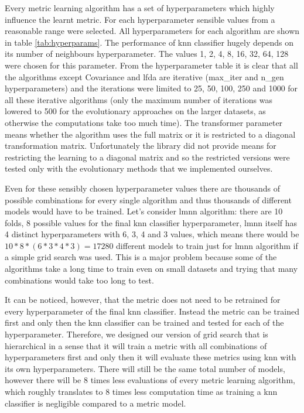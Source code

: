 \documentclass[12pt,a4paper]{report}
\begin{document}
Every metric learning algorithm has a set of hyperparameters which highly influence the learnt metric. For each hyperparameter sensible values from a reasonable range were selected. All hyperparameters for each algorithm are shown in table \ref{tab:hyperparams}. The performance of \ac{knn} classifier hugely depends on its number of neighbours hyperparameter. The values 1, 2, 4, 8, 16, 32, 64, 128 were chosen for this parameter. From the hyperparameter table it is clear that all the algorithms except Covariance and \ac{lfda} are iterative (max\_iter and n\_gen hyperparameters) and the iterations were limited to 25, 50, 100, 250 and 1000 for all these iterative algorithms (only the maximum number of iterations was lowered to 500 for the evolutionary approaches on the larger datasets, as otherwise the computations take too much time). The transformer parameter means whether the algorithm uses the full matrix or it is restricted to a diagonal transformation matrix. Unfortunately the library did not provide means for restricting the learning to a diagonal matrix and so the restricted versions were tested only with the evolutionary methods that we implemented ourselves. %



Even for these sensibly chosen hyperparameter values there are thousands of possible combinations for every single algorithm and thus thousands of different models would have to be trained. Let's consider \ac{lmnn} algorithm: there are 10 folds, 8 possible values for the final \ac{knn} classifier hyperparameter, \ac{lmnn} itself has 4 distinct hyperparameters with 6, 3, 4 and 3 values, which means there would be $10*8*(6*3*4*3)=17280$ different models to train just for \ac{lmnn} algorithm if a simple grid search was used. This is a major problem because some of the algorithms take a long time to train even on small datasets and trying that many combinations would take too long to test.

It can be noticed, however, that the metric does not need to be retrained for every hyperparameter of the final \ac{knn} classifier. Instead the metric can be trained first and only then the \ac{knn} classifier can be trained and tested for each of the hyperparameter. Therefore, we designed our version of grid search that is hierarchical in a sense that it will train a metric with all combinations of hyperparameters first and only then it will evaluate these metrics using \ac{knn} with its own hyperparameters. There will still be the same total number of models, however there will be 8 times less evaluations of every metric learning algorithm, which roughly translates to 8 times less computation time as training a \ac{knn} classifier is negligible compared to a metric model.
\end{document}
